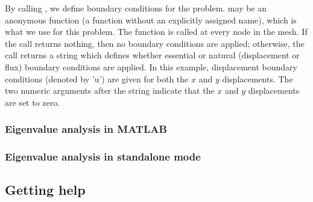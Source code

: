 \begin{itemize}
By calling , we define boundary conditions
for the problem.   may be an anonymous function (a
function without an explicitly assigned name), which is what we use
for this problem.  The function is called at every node in the mesh.
If the call returns nothing, then no boundary conditions are applied;
otherwise, the call returns a string which defines whether essential
or natural (displacement or flux) boundary conditions are applied.  In
this example, displacement boundary conditions (denoted by 'u') are
given for both the $x$ and $y$ displacements.  The two numeric
arguments after the string indicate that the $x$ and $y$ displacements
are set to zero.

\end{itemize}

\subsubsection{Eigenvalue analysis in MATLAB}
\subsubsection{Eigenvalue analysis in standalone mode}

\subsection{Getting help}
